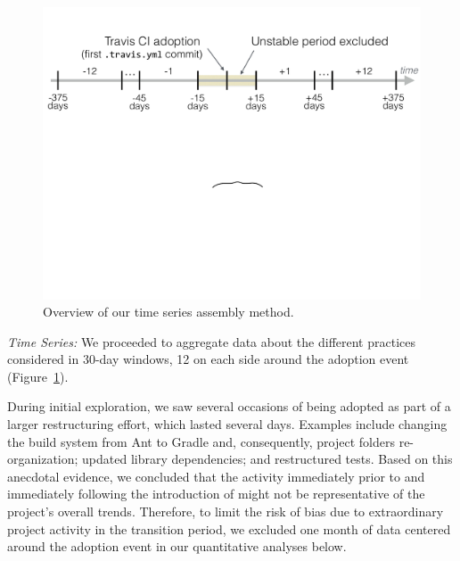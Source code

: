 \begin{figure}[t]
	\centering
	\includegraphics[width=0.9\columnwidth, clip=true, trim=0 392 0 40]{figures/timeline.pdf}
	\caption{Overview of our time series assembly method.}\vspace{-0.3cm}
	\label{fig:timeseries}
\end{figure}

\smallskip\noindent\emph{Time Series:}
We proceeded to aggregate data about the different practices considered
in 30-day windows, 12 on each side around the \Tvis adoption event
(Figure~\ref{fig:timeseries}).

During initial exploration, we saw several occasions of \Tvi being 
adopted as part of a larger restructuring effort, which lasted several days.
Examples include changing the build system from Ant to Gradle and, 
consequently, project folders re-organization; updated library 
dependencies; and restructured tests.
Based on this anecdotal evidence, we concluded that the activity immediately 
prior to and immediately following the introduction of \Tvis might not be 
representative of the project's overall trends.
Therefore, to limit the risk of bias due to extraordinary project activity in 
the transition period, we excluded one month of data centered around the 
adoption event in our quantitative analyses below.

